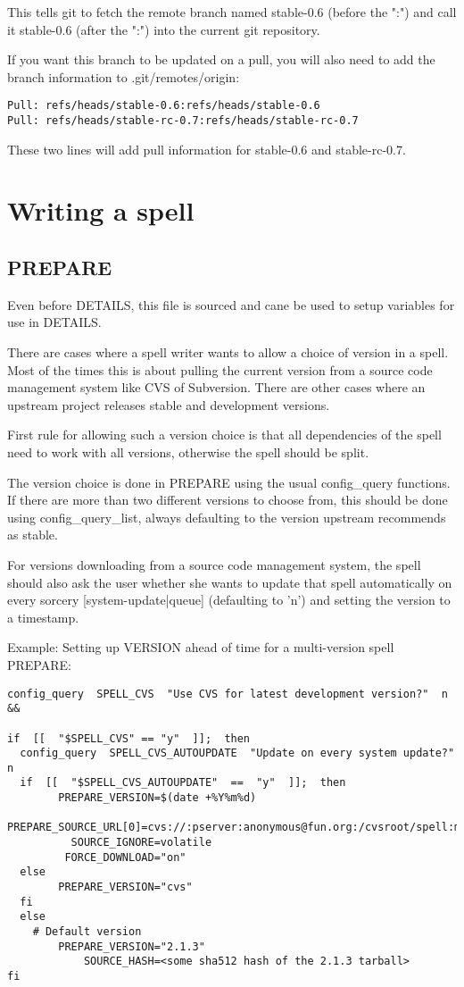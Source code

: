 \documentclass[a4paper,10pt]{book}
\begin{document}
This tells git to fetch the remote branch named stable-0.6 (before the ":") and
call it stable-0.6 (after the ":") into the current git repository.

If you want this branch to be updated on a pull, you will also need to add
the branch information to .git/remotes/origin:
\begin{verbatim}
Pull: refs/heads/stable-0.6:refs/heads/stable-0.6
Pull: refs/heads/stable-rc-0.7:refs/heads/stable-rc-0.7
\end{verbatim}

These two lines will add pull information for stable-0.6 and stable-rc-0.7.

\chapter{Writing a spell}
\section{PREPARE}
Even before DETAILS, this file is sourced and cane be used to setup variables
for use in DETAILS.

There are cases where a spell writer wants to allow a choice of version in a
spell. Most of the times this is about pulling the current version from a
source code management system like CVS of Subversion. There are other cases
where an upstream project releases stable and development versions.

First rule for allowing such a version choice is that all dependencies of the
spell need to work with all versions, otherwise the spell should be split.

The version choice is done in PREPARE using the usual config\_query functions.
If there are more than two different versions to choose from, this should be
done using config\_query\_list, always defaulting to the version upstream
recommends as stable.

For versions downloading from a source code management system, the spell should
also ask the user whether she wants to update that spell automatically on every
sorcery [system-update|queue] (defaulting to 'n') and setting the version to
a timestamp.

Example: Setting up VERSION ahead of time for a multi-version spell
PREPARE:
\begin{verbatim}
config_query  SPELL_CVS  "Use CVS for latest development version?"  n  &&

if  [[  "$SPELL_CVS" == "y"  ]];  then
  config_query  SPELL_CVS_AUTOUPDATE  "Update on every system update?"  n
  if  [[  "$SPELL_CVS_AUTOUPDATE"  ==  "y"  ]];  then
        PREPARE_VERSION=$(date +%Y%m%d)
  PREPARE_SOURCE_URL[0]=cvs://:pserver:anonymous@fun.org:/cvsroot/spell:main
          SOURCE_IGNORE=volatile
         FORCE_DOWNLOAD="on"
  else
        PREPARE_VERSION="cvs"
  fi
  else
    # Default version
        PREPARE_VERSION="2.1.3"
            SOURCE_HASH=<some sha512 hash of the 2.1.3 tarball>
fi
\end{verbatim}
\end{document}

